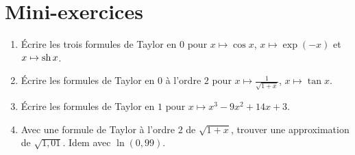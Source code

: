 \section{Mini-exercices}

\begin{frame}

\begin{miniexercice}
\begin{enumerate}
  \item Écrire les trois formules de Taylor en $0$ pour $x \mapsto \cos x$, $x\mapsto \exp(-x)$ et $x\mapsto \mathop{\text{sh}}\nolimits x$.
  \item Écrire les formules de Taylor en $0$ à l'ordre $2$ pour $x \mapsto \frac{1}{\sqrt{1+x}}$, $x\mapsto \tan x$.
  \item Écrire les formules de Taylor en $1$ pour $x \mapsto x^3-9x^2+14x+3$.
  \item Avec une formule de Taylor à l'ordre $2$ de $\sqrt{1+x}$, trouver une approximation 
de $\sqrt{1,01}$. Idem avec $\ln(0,99)$.
\end{enumerate}
\end{miniexercice}

\end{frame}

